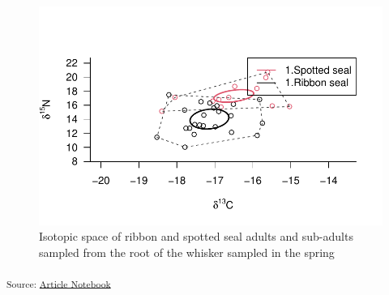 \documentclass[
  authoryear,
  preprint,
  3p,
  onecolumn]{elsarticle}
\begin{document}
\begin{figure}[H]

{\centering \includegraphics{index_files/figure-pdf/unnamed-chunk-16-1.pdf}

}

\caption{Isotopic space of ribbon and spotted seal adults and sub-adults
sampled from the root of the whisker sampled in the spring}

\end{figure}%

\textsubscript{Source:
\href{https://noaa-afsc.github.io/ribbon-spotted-niche-partition/index.qmd.html}{Article
Notebook}}
\end{document}

